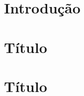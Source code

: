 \documentclass[oneside,a4paper,12pt]{book}
\theoremstyle{plain}
\begin{document}
\chapter*{Introdução}

\chapter{Título}

\chapter{Título}    
  
    


  
\end{document}
